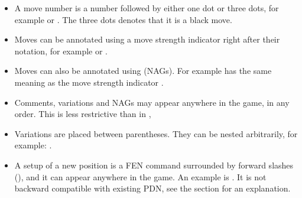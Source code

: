 \documentclass[letterpaper,10pt,english]{sphinxmanual}
\begin{document}
\begin{itemize}
\item {} 
\sphinxAtStartPar
A move number is a number followed by either one dot or three dots, for example  or
. The three dots denotes that it is a black move.

\item {} 
\sphinxAtStartPar
Moves can be annotated using a move strength indicator right after their notation, for example  or .

\item {} 
\sphinxAtStartPar
Moves can also be annotated using 
(NAGs). For example  has the same meaning as the move strength indicator \sphinxcode{\sphinxupquote{!}}.

\item {} 
\sphinxAtStartPar
Comments, variations and NAGs may appear anywhere in the game, in any order. This is less
restrictive than in ,

\item {} 
\sphinxAtStartPar
Variations are placed between parentheses. They can be nested arbitrarily, for example:
.

\item {} 
\sphinxAtStartPar
A setup of a new position is a FEN command surrounded by forward slashes (\sphinxcode{\sphinxupquote{/}}), and it can appear
anywhere in the game. An example is .
It is not backward compatible with existing PDN, see the {\hyperref[\detokenize{commands:commands-section}]{}} section
for an explanation.

\end{itemize}
\end{document}
